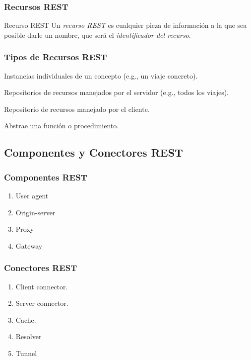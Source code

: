 \documentclass[handout,a4paper,slidestop,xcolor=pst,blue]{beamer}
\begin{document}
\begin{frame}[c]
	\frametitle{Recursos REST}
    \begin{block}{Recurso REST}
        Un \emph{recurso REST} es cualquier pieza de información a la que sea posible darle un nombre, que será el \emph{identificador del recurso}.
    \end{block}
\end{frame}

\begin{frame}[c]
    \frametitle{Tipos de Recursos REST}
    \begin{description}[<+->]
        \item[Documentos] Instancias individuales de un concepto (e.g., un viaje concreto).
        \item[Colecciones] Repositorios de recursos manejados por el servidor (e.g., todos los viajes).
        \item[Store] Repositorio de recursos manejado por el cliente.
        \item[Controller] Abstrae una función o procedimiento.
    \end{description}
\end{frame}

\subsection{Componentes y Conectores REST}

\begin{frame}[c]
    \frametitle{Componentes REST}
    \begin{enumerate}[<+->]
        \item User agent
        \item Origin-server
        \item Proxy
        \item Gateway
    \end{enumerate}
\end{frame}

\begin{frame}[c]
    \frametitle{Conectores REST}
    \begin{enumerate}[<+->]
        \item Client connector.
        \item Server connector.
        \item Cache.
        \item Resolver
        \item Tunnel
    \end{enumerate}

\end{frame}
\end{document}
